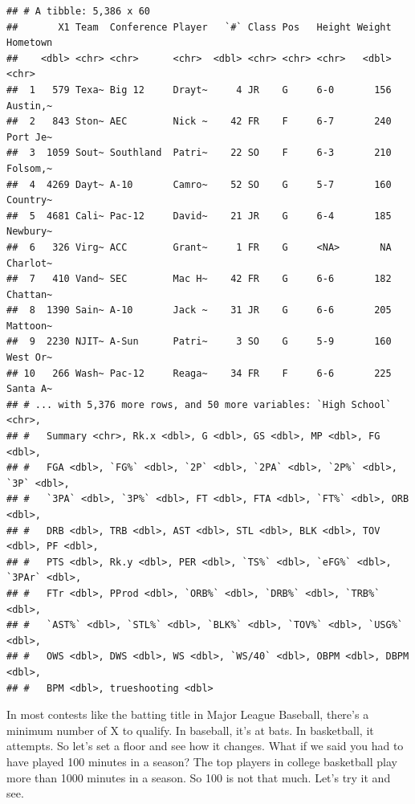 \documentclass[]{book}
\newenvironment{Shaded}{\begin{snugshade}}{\end{snugshade}}
\newcommand{\DataTypeTok}[1]{\textcolor[rgb]{0.13,0.29,0.53}{#1}}
\newcommand{\DecValTok}[1]{\textcolor[rgb]{0.00,0.00,0.81}{#1}}
\newcommand{\KeywordTok}[1]{\textcolor[rgb]{0.13,0.29,0.53}{\textbf{#1}}}
\newcommand{\NormalTok}[1]{#1}
\newcommand{\OperatorTok}[1]{\textcolor[rgb]{0.81,0.36,0.00}{\textbf{#1}}}
\newcommand{\StringTok}[1]{\textcolor[rgb]{0.31,0.60,0.02}{#1}}
\begin{document}
\begin{verbatim}
## # A tibble: 5,386 x 60
##       X1 Team  Conference Player   `#` Class Pos   Height Weight Hometown
##    <dbl> <chr> <chr>      <chr>  <dbl> <chr> <chr> <chr>   <dbl> <chr>   
##  1   579 Texa~ Big 12     Drayt~     4 JR    G     6-0       156 Austin,~
##  2   843 Ston~ AEC        Nick ~    42 FR    F     6-7       240 Port Je~
##  3  1059 Sout~ Southland  Patri~    22 SO    F     6-3       210 Folsom,~
##  4  4269 Dayt~ A-10       Camro~    52 SO    G     5-7       160 Country~
##  5  4681 Cali~ Pac-12     David~    21 JR    G     6-4       185 Newbury~
##  6   326 Virg~ ACC        Grant~     1 FR    G     <NA>       NA Charlot~
##  7   410 Vand~ SEC        Mac H~    42 FR    G     6-6       182 Chattan~
##  8  1390 Sain~ A-10       Jack ~    31 JR    G     6-6       205 Mattoon~
##  9  2230 NJIT~ A-Sun      Patri~     3 SO    G     5-9       160 West Or~
## 10   266 Wash~ Pac-12     Reaga~    34 FR    F     6-6       225 Santa A~
## # ... with 5,376 more rows, and 50 more variables: `High School` <chr>,
## #   Summary <chr>, Rk.x <dbl>, G <dbl>, GS <dbl>, MP <dbl>, FG <dbl>,
## #   FGA <dbl>, `FG%` <dbl>, `2P` <dbl>, `2PA` <dbl>, `2P%` <dbl>, `3P` <dbl>,
## #   `3PA` <dbl>, `3P%` <dbl>, FT <dbl>, FTA <dbl>, `FT%` <dbl>, ORB <dbl>,
## #   DRB <dbl>, TRB <dbl>, AST <dbl>, STL <dbl>, BLK <dbl>, TOV <dbl>, PF <dbl>,
## #   PTS <dbl>, Rk.y <dbl>, PER <dbl>, `TS%` <dbl>, `eFG%` <dbl>, `3PAr` <dbl>,
## #   FTr <dbl>, PProd <dbl>, `ORB%` <dbl>, `DRB%` <dbl>, `TRB%` <dbl>,
## #   `AST%` <dbl>, `STL%` <dbl>, `BLK%` <dbl>, `TOV%` <dbl>, `USG%` <dbl>,
## #   OWS <dbl>, DWS <dbl>, WS <dbl>, `WS/40` <dbl>, OBPM <dbl>, DBPM <dbl>,
## #   BPM <dbl>, trueshooting <dbl>
\end{verbatim}

In most contests like the batting title in Major League Baseball, there's a minimum number of X to qualify. In baseball, it's at bats. In basketball, it attempts. So let's set a floor and see how it changes. What if we said you had to have played 100 minutes in a season? The top players in college basketball play more than 1000 minutes in a season. So 100 is not that much. Let's try it and see.

\begin{Shaded}
\end{Shaded}
\end{document}
